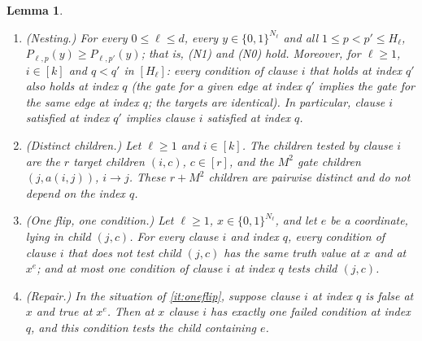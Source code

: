 \documentclass[11pt]{article}
\newtheorem{lemma}[theorem]{Lemma}
\theoremstyle{definition}
\theoremstyle{remark}
\begin{document}
\begin{lemma}\label{lem:structure}
\begin{enumerate}[label=\textup{(\alph*)},ref=\textup{(\alph*)}]
\item\label{it:nest} \textup{(Nesting.)} For every \(0\le\ell\le d\), every
 \(y\in\{0,1\}^{N_\ell}\) and all \(1\le p<p'\le H_\ell\),
 \(P_{\ell,p}(y)\ge P_{\ell,p'}(y)\); that is, \textup{(N1)} and
 \textup{(N0)} hold. Moreover, for \(\ell\ge1\), \(i\in[k]\) and \(q<q'\) in
 \([H_\ell]\): every condition of clause \(i\) that holds at index \(q'\)
 also holds at index \(q\) (the gate for a given edge at index \(q'\)
 implies the gate for the same edge at index \(q\); the targets are
 identical). In particular, clause \(i\) satisfied at index \(q'\) implies
 clause \(i\) satisfied at index \(q\).
\item\label{it:distinct} \textup{(Distinct children.)} Let \(\ell\ge1\) and
 \(i\in[k]\). The children tested by clause \(i\) are the \(r\) target
 children \((i,c)\), \(c\in[r]\), and the \(M^2\) gate children
 \((j,a(i,j))\), \(i\to j\). These \(r+M^2\) children are pairwise distinct
 and do not depend on the index \(q\).
\item\label{it:oneflip} \textup{(One flip, one condition.)} Let \(\ell\ge1\),
 \(x\in\{0,1\}^{N_\ell}\), and let \(e\) be a coordinate, lying in child
 \((j,c)\). For every clause \(i\) and index \(q\), every condition of
 clause \(i\) that does not test child \((j,c)\) has the same truth value
 at \(x\) and at \(x^e\); and at most one condition of clause \(i\) at index
 \(q\) tests child \((j,c)\).
\item\label{it:repair} \textup{(Repair.)} In the situation of
 \ref{it:oneflip}, suppose clause \(i\) at index \(q\) is false at \(x\) and
 true at \(x^e\). Then at \(x\) clause \(i\) has \emph{exactly one} failed
 condition at index \(q\), and this condition tests the child containing
 \(e\).
\end{enumerate}
\end{lemma}
\end{document}
